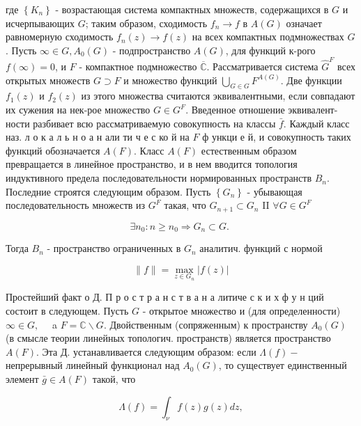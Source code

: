 \documentclass[10pt]{article}
\begin{document}
где $\left\{K_{n}\right\}$ - возрастающая система компактных множеств, содержащихся в $G$ и исчерпывающих $G$; таким образом, сходимость $f_{n} \rightarrow f$ в $A(G)$ означает равномерную сходимость $f_{n}(z) \rightarrow f(z)$ на всех компактных подмножествах $G$. Пусть $\infty \in G, A_{0}(G)$ - подпространство $A(G)$, для функций к-рого $f(\infty)=0$, и $F$ - компактное подмножество $\overline{\mathbb{C}}$. Рассматривается система $\hat{G}^{F}$ всех открытых множеств $G \supset F$ и множество функций $\bigcup_{G \in G} F^{A(G)}$. Две функции $f_{1}(z)$ и $f_{2}(z)$ из этого множества считаются эквивалентными, если совпадают их сужения на нек-рое множество $G \in G^{F}$. Введенное отношение эквивалент- ности разбивает всю рассматриваемую совокупность на классы $\bar{f}$. Каждый класс наз. л о к а л ь н о а н али ти ч е с ко й на $F$ ф ункци е й, и совокупность таких функций обозначается $A(F)$. Класс $A(F)$ естественным образом превращается в линейное пространство, и в нем вводится топология индуктивного предела последовательности нормированных пространств $B_{n}$. Последние строятся следующим образом. Пусть $\left\{G_{n}\right\}$ - убывающая последовательность множеств из $G^{F}$ такая, что $G_{n+1} \subset G_{n}$ II $\forall G \in G^{F}$



\[

\exists n_{0}: n \geqslant n_{0} \Rightarrow G_{n} \subset G \text {. }

\]



Тогда $B_{n}$ - пространство ограниченных в $G_{n}$ аналитич. функций с нормой



\[

\|f\|=\max _{z \in G_{n}}|f(z)|

\]



Простейший факт о Д. П р о с т р а н с т в а н а литиче с к и х ф у н ций состоит в следующем. Пусть $G$ - открытое множество и (для определенности) $\infty \in G, \quad$ a $F=\mathbb{C} \backslash G$. Двойственным (сопряженным) к пространству $A_{0}(G)$ (в смысле теории линейных топологич. пространств) является пространство $A(F)$. Эта Д. устанавливается следующим образом: если $\Lambda(f)-$ непрерывный линейный функционал над $A_{0}(G)$, то существует единственный элемент $\bar{g} \in A(F)$ такой, что



\[

\Lambda(f)=\int_{\nu} f(z) g(z) d z,

\]
\end{document}
